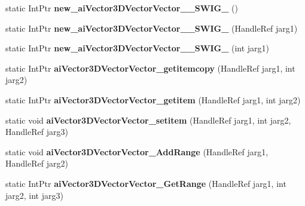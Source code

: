 \begin{DoxyCompactItemize}
\item 
\hypertarget{class_assimp_p_i_n_v_o_k_e_ae47587f60c42548126b54feae9994190}{static Int\+Ptr {\bfseries new\+\_\+ai\+Vector3\+D\+Vector\+Vector\+\_\+\+\_\+\+S\+W\+I\+G\+\_} ()}\label{class_assimp_p_i_n_v_o_k_e_ae47587f60c42548126b54feae9994190}

\item 
\hypertarget{class_assimp_p_i_n_v_o_k_e_aed83061c3b6bb39bfba1314387d54dab}{static Int\+Ptr {\bfseries new\+\_\+ai\+Vector3\+D\+Vector\+Vector\+\_\+\+\_\+\+S\+W\+I\+G\+\_} (Handle\+Ref jarg1)}\label{class_assimp_p_i_n_v_o_k_e_aed83061c3b6bb39bfba1314387d54dab}

\item 
\hypertarget{class_assimp_p_i_n_v_o_k_e_a7b1c387adad730f611e82d2731100e4b}{static Int\+Ptr {\bfseries new\+\_\+ai\+Vector3\+D\+Vector\+Vector\+\_\+\+\_\+\+S\+W\+I\+G\+\_} (int jarg1)}\label{class_assimp_p_i_n_v_o_k_e_a7b1c387adad730f611e82d2731100e4b}

\item 
\hypertarget{class_assimp_p_i_n_v_o_k_e_a7419af54cd39e760a2e014d1a1f05131}{static Int\+Ptr {\bfseries ai\+Vector3\+D\+Vector\+Vector\+\_\+getitemcopy} (Handle\+Ref jarg1, int jarg2)}\label{class_assimp_p_i_n_v_o_k_e_a7419af54cd39e760a2e014d1a1f05131}

\item 
\hypertarget{class_assimp_p_i_n_v_o_k_e_a850eb60a9f5da8201f39d756fb7d993d}{static Int\+Ptr {\bfseries ai\+Vector3\+D\+Vector\+Vector\+\_\+getitem} (Handle\+Ref jarg1, int jarg2)}\label{class_assimp_p_i_n_v_o_k_e_a850eb60a9f5da8201f39d756fb7d993d}

\item 
\hypertarget{class_assimp_p_i_n_v_o_k_e_a65bd61ac34f999f8f2be1b7f8ce15868}{static void {\bfseries ai\+Vector3\+D\+Vector\+Vector\+\_\+setitem} (Handle\+Ref jarg1, int jarg2, Handle\+Ref jarg3)}\label{class_assimp_p_i_n_v_o_k_e_a65bd61ac34f999f8f2be1b7f8ce15868}

\item 
\hypertarget{class_assimp_p_i_n_v_o_k_e_aa0b8b03f60101f3be31df7cab90ac07d}{static void {\bfseries ai\+Vector3\+D\+Vector\+Vector\+\_\+\+Add\+Range} (Handle\+Ref jarg1, Handle\+Ref jarg2)}\label{class_assimp_p_i_n_v_o_k_e_aa0b8b03f60101f3be31df7cab90ac07d}

\item 
\hypertarget{class_assimp_p_i_n_v_o_k_e_a75df6c85f606112cf609f9dd8a035dc1}{static Int\+Ptr {\bfseries ai\+Vector3\+D\+Vector\+Vector\+\_\+\+Get\+Range} (Handle\+Ref jarg1, int jarg2, int jarg3)}\label{class_assimp_p_i_n_v_o_k_e_a75df6c85f606112cf609f9dd8a035dc1}


\end{DoxyCompactItemize}
